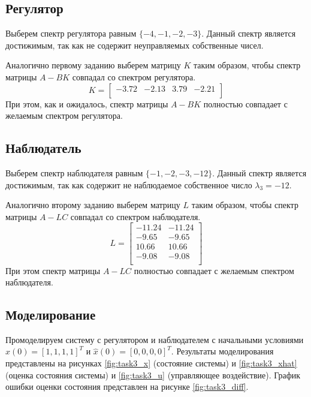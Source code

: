 \subsection{Регулятор}
Выберем спектр регулятора равным $\{-4, -1, -2, -3\}$. Данный спектр является достижимым, 
так как не содержит неуправляемых собственные чисел. 

Аналогично первому заданию выберем матрицу $K$ таким образом, чтобы спектр матрицы $A - BK$
совпадал со спектром регулятора.
\begin{equation}
    K = \begin{bmatrix}
        -3.72  & -2.13  & 3.79  & -2.21 \\ 
    \end{bmatrix}
\end{equation}
При этом, как и ожидалось, спектр матрицы $A - BK$ полностью совпадает с желаемым спектром регулятора.

\subsection{Наблюдатель}
Выберем спектр наблюдателя равным $\{-1, -2, -3, -12\}$. Данный спектр является достижимым,
так как содержит не наблюдаемое собственное число $\lambda_3 = -12$.

Аналогично второму заданию выберем матрицу $L$ таким образом, чтобы спектр матрицы $A - LC$
совпадал со спектром наблюдателя.
\begin{equation}
    L = \begin{bmatrix}
        -11.24  & -11.24 \\ 
        -9.65  & -9.65 \\ 
        10.66  & 10.66 \\ 
        -9.08  & -9.08 \\ 
    \end{bmatrix}
\end{equation}
При этом спектр матрицы $A - LC$ полностью совпадает с желаемым спектром наблюдателя.

\subsection{Моделирование}
Промоделируем систему с регулятором и наблюдателем с начальными условиями $x(0) = [1, 1, 1, 1]^T$ и $\hat{x}(0) = [0, 0, 0, 0]^T$. 
Результаты моделирования представлены на рисунках \ref{fig:task3_x} (состояние системы) и \ref{fig:task3_xhat} (оценка состояния системы) и 
\ref{fig:task3_u} (управляющее воздействие). График ошибки оценки состояния представлен на рисунке \ref{fig:task3_diff}.

